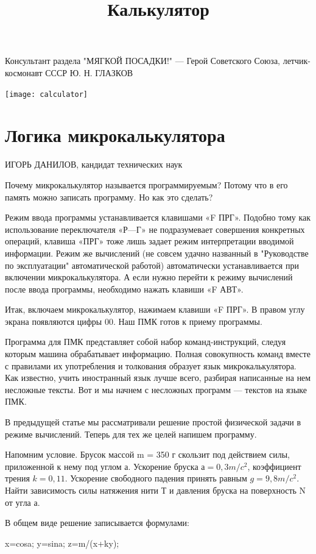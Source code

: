 \documentclass[11pt,a4paper,oneside]{article}
\title{Калькулятор}
\begin{document}
\maketitle
\tableofcontents

Консультант раздела "МЯГКОЙ ПОСАДКИ!" — Герой Советского Союза, летчик-космонавт СССР
Ю. Н. ГЛАЗКОВ
\pagebreak

\texttt{[image: calculator]}
\section{Логика микрокалькулятора}
ИГОРЬ ДАНИЛОВ, кандидат технических наук

Почему микрокалькулятор называется программируемым? Потому что в его память можно записать программу. Но как это сделать?

Режим ввода программы устанавливается клавишами «F ПРГ». Подобно тому как использование переключателя «Р—Г» не подразумевает совершения конкретных операций, клавиша «ПРГ» тоже лишь задает режим интерпретации вводимой информации. Режим же вычислений (не совсем удачно названный в "Руководстве по эксплуатации" автоматической работой) автоматически устанавливается при включении микрокалькулятора. А если нужно перейти к режиму вычислений после ввода программы, необходимо нажать клавиши «F АВТ».

Итак, включаем микрокалькулятор, нажимаем клавиши «F ПРГ». В правом углу экрана появляются цифры 00. Наш ПМК готов к приему программы.

Программа для ПМК представляет собой набор команд-инструкций, следуя которым машина обрабатывает информацию. Полная совокупность команд вместе с правилами их употребления и толкования образует язык микрокалькулятора. Как известно, учить иностранный язык лучше всего, разбирая написанные на нем несложные тексты. Вот и мы начнем с несложных программ — текстов на языке ПМК.

В предыдущей статье мы рассматривали решение простой физической задачи в режиме вычислений. Теперь для тех же целей напишем программу.

Напомним условие. Брусок массой m = 350 г скользит под действием силы, приложенной к нему под углом а. Ускорение бруска $а=0,3 m/c^{2}$, коэффициент трения $k=0,11$. Ускорение свободного падения принять равным $g=9,8 m/c^{2}$. Найти зависимость силы натяжения нити Т и давления бруска на поверхность N от угла а.

В общем виде решение записывается формулами:

x=cosa; y=sina; z=m/(x+ky);
\end{document}
